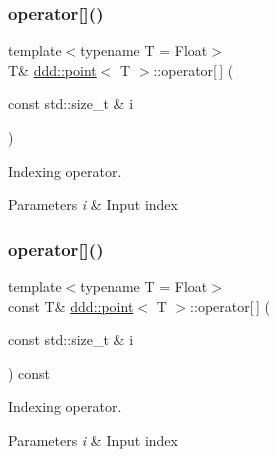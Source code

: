\subsubsection{\texorpdfstring{operator[]()}{operator[]()}\hspace{0.1cm}{\footnotesize\ttfamily [1/2]}}
{\footnotesize\ttfamily template$<$typename T = Float$>$ \\
T\& \hyperlink{classddd_1_1point}{ddd\+::point}$<$ T $>$\+::operator\mbox{[}$\,$\mbox{]} (\begin{DoxyParamCaption}\item[{const std\+::size\+\_\+t \&}]{i }\end{DoxyParamCaption})\hspace{0.3cm}{\ttfamily [inline]}}



Indexing operator. 


\begin{DoxyParams}{Parameters}
{\em i} & Input index \\
\hline
\end{DoxyParams}
\mbox{\label{classddd_1_1point_a320e2bfca11915c5ebb9ed0581a3cab1}} 
\subsubsection{\texorpdfstring{operator[]()}{operator[]()}\hspace{0.1cm}{\footnotesize\ttfamily [2/2]}}
{\footnotesize\ttfamily template$<$typename T = Float$>$ \\
const T\& \hyperlink{classddd_1_1point}{ddd\+::point}$<$ T $>$\+::operator\mbox{[}$\,$\mbox{]} (\begin{DoxyParamCaption}\item[{const std\+::size\+\_\+t \&}]{i }\end{DoxyParamCaption}) const\hspace{0.3cm}{\ttfamily [inline]}}



Indexing operator. 


\begin{DoxyParams}{Parameters}
{\em i} & Input index \\
\hline
\end{DoxyParams}
\mbox{\label{classddd_1_1point_abcfac6d6f3992972e64595ac795cefbb}} 
